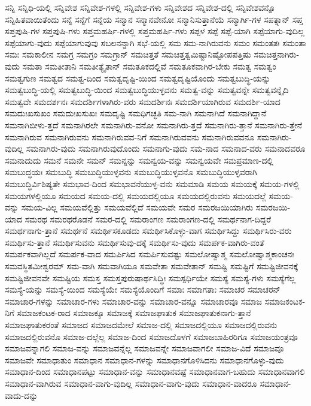{ಸನ್ನಿ
ಸನ್ನಿಧಿ-ಯಲ್ಲಿ
ಸನ್ನಿವೇಶ
ಸನ್ನಿವೇಶ-ಗಳಲ್ಲಿ
ಸನ್ನಿವೇಶ-ಗಳು
ಸನ್ನಿವೇಶದ
ಸನ್ನಿವೇಶ-ದಲ್ಲಿ
ಸನ್ನಿವೇಶವನ್ನೊ
ಸನ್ನಿಹಿತವಾಯಿತೆಂದು
ಸನ್ನೆ
ಸನ್ನೆಗೆ
ಸನ್ನೆಯ
ಸನ್ಮಾನ
ಸನ್ಮಾನವೇನೋ
ಸನ್ಮಾನಿಸುತ್ತಾನೆಯೆ
ಸನ್ಮಾರ್ಗಿ-ಗಳ
ಸಪತ್ನಾನ್
ಸಪ್ತ
ಸಪ್ತಪುಷಿ-ಗಳ
ಸಪ್ತಪುಷಿ-ಗಳು
ಸಪ್ತಮಹರ್ಷಿ-ಗಳಲ್ಲಿ
ಸಪ್ತಮಹರ್ಷಿ-ಗಳು
ಸಪ್ಪಳ
ಸಪ್ಪೆ
ಸಪ್ಪೆ-ಯಾಗಿ
ಸಪ್ಪೆಯಾಗು-ವುದಿಲ್ಲ
ಸಪ್ಪೆಯಾಗು-ವುದು
ಸಪ್ಪೆಯಾಗುವುವು
ಸಬಲನನ್ನಾಗಿ
ಸಭೆ-ಯಲ್ಲಿ
ಸಮ
ಸಮ-ನಾಗಿರುವನು
ಸಮಂ
ಸಮಂತತಃ
ಸಮಂತಾ
ಸಮಃ
ಸಮಕಾಲೀನ
ಸಮಗ್ರ
ಸಮಗ್ರಂ
ಸಮಗ್ರಾನ್
ಸಮಚಿತ್ತತೆ
ಸಮಚಿತ್ತತ್ವಮಿಷ್ಟಾನಿಷ್ಟೋಪಪತ್ತಿಷು
ಸಮಚಿತ್ತನಾಗಿರು-ವುದು
ಸಮತಾ
ಸಮತೀತಾನಿ
ಸಮತೀತ್ಯೈತಾನ್
ಸಮತೂಕದಲ್ಲಿವೆ
ಸಮತೂಕವಾಗಿರ-ಬೇಕು
ಸಮತ್ವ
ಸಮತ್ವಂ
ಸಮತ್ವಗುಣ
ಸಮತ್ವದ
ಸಮತ್ವ-ದಿಂದ
ಸಮತ್ವದೃಷ್ಟಿ-ಯಿಂದ
ಸಮತ್ವದೃಷ್ಟಿಯೊಂದು
ಸಮತ್ವಬುದ್ಧಿ-ಯನ್ನು
ಸಮತ್ವಬುದ್ಧಿ-ಯಲ್ಲಿ
ಸಮತ್ವಬುದ್ಧಿ-ಯಿಂದ
ಸಮತ್ವಬುದ್ಧಿಯುಳ್ಳವನು
ಸಮತ್ವ-ವನ್ನು
ಸಮತ್ವವನ್ನೇ
ಸಮತ್ವವನ್ನೈದಿ
ಸಮತ್ವವೇ
ಸಮದರ್ಶನಃ
ಸಮದರ್ಶಿಗಳಾಗಿರು-ವರು
ಸಮದರ್ಶಿನಃ
ಸಮದರ್ಶಿಯಾಗಿರುವ
ಸಮದರ್ಶಿ-ಯಾದ
ಸಮದುಃಖಸುಖಂ
ಸಮದುಃಖಸುಖಃ
ಸಮದೃಷ್ಟಿ
ಸಮಧಿಗಚ್ಛತಿ
ಸಮ-ನಾಗಿ
ಸಮನಾಗಿದೆ
ಸಮನಾಗಿದ್ದಾನೆ
ಸಮನಾಗಿಬೀಳು-ತ್ತದೆ
ಸಮನಾಗಿರಲೇ
ಸಮನಾಗಿರು-ವನೋ
ಸಮನಾಗಿರು-ತ್ತದೆ
ಸಮನಾಗಿರು-ತ್ತಾನೆ
ಸಮನಾಗಿರು-ತ್ತೇನೆ
ಸಮನಾಗಿರುವ
ಸಮನಾಗಿರುವನು
ಸಮನಾಗಿರುವವ-ನಿಗೆ
ಸಮನಾಗಿರುವವನು
ಸಮನಾಗಿರುವವನೂ
ಸಮನಾಗಿರು-ವುದಿಲ್ಲ
ಸಮನಾಗಿರು-ವುದು
ಸಮನಾಗಿರುವುದೊಂದು
ಸಮನಾಗು-ವುದು
ಸಮ-ನಾದ
ಸಮನಾದ-ವರು
ಸಮನಾದವರೂ
ಸಮನಾದುದು
ಸಮನೆ
ಸಮನೇ
ಸಮನ್
ಸಮನ್ನನ್ನು
ಸಮನ್ವಯ-ವನ್ನು
ಸಮನ್ವಯವೇ
ಸಮಪ್ರಮಾಣ-ದಲ್ಲಿ
ಸಮಬುದ್ಧಯಃ
ಸಮಬುದ್ಧಿ
ಸಮಬುದ್ಧಿಯುಳ್ಳವನು
ಸಮಬುದ್ಧಿಯುಳ್ಳವನೊ
ಸಮಬುದ್ಧಿಯುಳ್ಳವರಾಗಿ
ಸಮಬುದ್ಧಿರ್ವಿಶಿಷ್ಯತೇ
ಸಮಭಾವ-ದಿಂದ
ಸಮಭಾವನೆಯುಳ್ಳ-ವನು
ಸಮಮಾಡಿ
ಸಮಯ
ಸಮಯಕ್ಕೆ
ಸಮಯ-ಗಳಲ್ಲಿ
ಸಮಯಗಳಲ್ಲಿಯೂ
ಸಮಯದ
ಸಮಯ-ದಲ್ಲಿ
ಸಮಯದಲ್ಲಿಯೂ
ಸಮಯದಲ್ಲಿರುವನು
ಸಮಯದಲ್ಲೆ
ಸಮಯ-ವನ್ನು
ಸಮಯ-ವಿಲ್ಲ
ಸಮಯವೆಲ್ಲಿತ್ತು
ಸಮಯವೆಲ್ಲಿದೆ
ಸಮಯವೇ
ಸಮರ
ಸಮರಜಯಿಯಾಗಿರು
ಸಮರಜಯಿ-ಯಾದ
ಸಮರಥ
ಸಮರಥರೊಡನೆ
ಸಮರ-ದಲ್ಲಿ
ಸಮರಾಂಗಣ
ಸಮರಾಂಗಣ-ದಲ್ಲಿ
ಸಮರ್ಥನಾಗ-ದಿದ್ದರೆ
ಸಮರ್ಥನಾಗು-ತ್ತಾನೆ
ಸಮರ್ಥನೆ
ಸಮರ್ಥಿಸಕೂಡದು
ಸಮರ್ಥಿಸಿಕೊಳ್ಳು-ವಾಗ
ಸಮರ್ಥಿಸಿದ್ದು
ಸಮರ್ಥಿಸಿರು-ವರು
ಸಮರ್ಥಿಸು-ತ್ತಾನೆ
ಸಮರ್ಥಿಸುವನು
ಸಮರ್ಥಿಸುವು-ದಕ್ಕೆ
ಸಮರ್ಥಿಸು-ವುದು
ಸಮರ್ಪಕ-ವಾಗಿರು-ವಂತೆ
ಸಮರ್ಪಕವಾಗಿಲ್ಲದೆ
ಸಮರ್ಪಕ-ವಾದ
ಸಮರ್ಪಿಸಿದ
ಸಮರ್ಪಿಸುವಷ್ಟು
ಸಮಲೋಷ್ವಾಶ್ಮ
ಸಮಲೋಷ್ವಾಶ್ಮಕಾಂಚನಃ
ಸಮವಸ್ಥಿತಮೀಶ್ವರಮ್
ಸಮ-ವಾಗಿ
ಸಮವಾಗಿಯೂ
ಸಮವೇತಾ
ಸಮವೇತಾನ್
ಸಮಷ್ಟಿ
ಸಮಷ್ಟಿಗೆ
ಸಮಷ್ಟಿಜೀವನಕ್ಕೆ
ಸಮಷ್ಟಿಜೀವನವೇ
ಸಮಷ್ಟಿಯ
ಸಮಸ್ತ
ಸಮಸ್ತಪುರುಷಾರ್ಥಸಿದ್ಧಿಃ
ಸಮಸ್ಪರ್ಧಿಯೇ
ಸಮಸ್ಯೆ
ಸಮಸ್ಯೆ-ಗಳು
ಸಮಸ್ಯೆಗೆಲ್ಲ
ಸಮಸ್ಯೆ-ಯನ್ನು
ಸಮಸ್ಯೆ-ಯಿಂದ
ಸಮಸ್ಯೆಯೇ
ಸಮಸ್ಯೆಯೊಂದಿಗೆ
ಸಮಾಃ
ಸಮಾಗತಾಃ
ಸಮಾಚರ
ಸಮಾಚರನ್
ಸಮಾಚಾರ-ಗಳನ್ನು
ಸಮಾಚಾರ-ಗಳು
ಸಮಾಚಾರ-ವನ್ನು
ಸಮಾಚಾರ-ವನ್ನೂ
ಸಮಾಚಾರವೂ
ಸಮಾಜ
ಸಮಾಜಕಂಟಕ-ನಿಗೆ
ಸಮಾಜಕಂಟಕ-ರಾದ
ಸಮಾಜಕ್ಕೂ
ಸಮಾಜಕ್ಕೆ
ಸಮಾಜಘಾತುಕ
ಸಮಾಜಘಾತುಕನಾಗು-ತ್ತಾನೆ
ಸಮಾಜಘಾತುಕರಂತೆ
ಸಮಾಜದ
ಸಮಾಜದಮೇಲೆ
ಸಮಾಜ-ದಲ್ಲಿ
ಸಮಾಜದಲ್ಲಿಯೂ
ಸಮಾಜದಲ್ಲಿರುವನು
ಸಮಾಜದಲ್ಲಿರುವನೊ
ಸಮಾಜ-ದಲ್ಲೆಲ್ಲ
ಸಮಾಜ-ದಿಂದ
ಸಮಾಜದೊಳಗೆ
ಸಮಾಜಬಾಹಿರರಿಗೂ
ಸಮಾಜಯಂತ್ರವೂ
ಸಮಾಜವನ್ನಾಗಲಿ
ಸಮಾಜ-ವನ್ನು
ಸಮಾಜವನ್ನೆಲ್ಲ
ಸಮಾಜವನ್ನೇ
ಸಮಾಜವಾಗಲೀ
ಸಮಾಜ-ವಿದೆ
ಸಮಾಜವೂ
ಸಮಾಜವೇ
ಸಮಾಧಾತುಂ
ಸಮಾಧಾನ
ಸಮಾಧಾನ-ಗಳನ್ನು
ಸಮಾಧಾನಗೊಳಿಸಿದನು
ಸಮಾಧಾನಗೊಳ್ಳು-ವುದು
ಸಮಾಧಾನ-ದಿಂದ
ಸಮಾಧಾನಪಟ್ಟು
ಸಮಾಧಾನ-ವನ್ನು
ಸಮಾಧಾನವಷ್ಟೆ
ಸಮಾಧಾನವಾಗ-ಬಹುದು
ಸಮಾಧಾನವಾಗಲಿ
ಸಮಾಧಾನ-ವಾಗಿರುವ
ಸಮಾಧಾನ-ವಾಗು-ವುದಿಲ್ಲ
ಸಮಾಧಾನ-ವಾಗು-ವುದು
ಸಮಾಧಾನ-ವಾದರೂ
ಸಮಾಧಾನ-ವಾದು-ದನ್ನು
}
